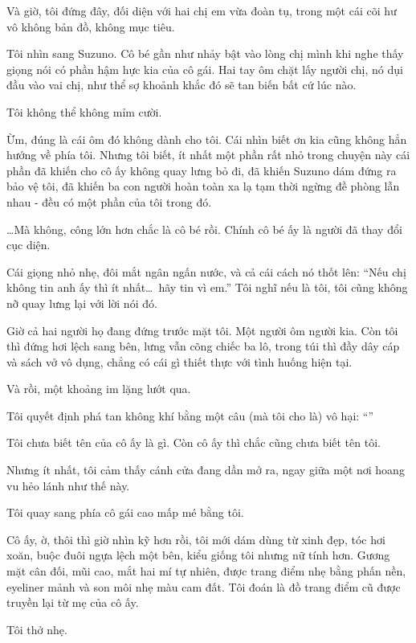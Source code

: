 \documentclass[../main.tex]{subfiles}
\begin{document}
Và giờ, tôi đứng đây, đối diện với hai chị em vừa đoàn tụ, trong một cái cõi hư vô không bản đồ, không mục tiêu.

Tôi nhìn sang Suzuno. Cô bé gần như nhảy bật vào lòng chị mình khi nghe thấy giọng nói có phần hậm hực kia của cô gái. Hai tay ôm chặt lấy người chị, nó dụi đầu vào vai chị, như thể sợ khoảnh khắc đó sẽ tan biến bất cứ lúc nào.

Tôi không thể không mỉm cười.

Ừm, đúng là cái ôm đó không dành cho tôi. Cái nhìn biết ơn kia cũng không hẳn hướng về phía tôi. Nhưng tôi biết, ít nhất một phần rất nhỏ trong chuyện này cái phần đã khiến cho cô ấy không quay lưng bỏ đi, đã khiến Suzuno dám đứng ra bảo vệ tôi, đã khiến ba con người hoàn toàn xa lạ tạm thời ngừng đề phòng lẫn nhau - đều có một phần của tôi trong đó.

\dots Mà không, công lớn hơn chắc là cô bé rồi. Chính cô bé ấy là người đã thay đổi cục diện.

Cái giọng nhỏ nhẹ, đôi mắt ngân ngấn nước, và cả cái cách nó thốt lên: ``Nếu chị không tin anh ấy thì ít nhất\dots\ hãy tin vì em.'' Tôi nghĩ nếu là tôi, tôi cũng không nỡ quay lưng lại với lời nói đó.

Giờ cả hai người họ đang đứng trước mặt tôi. Một người ôm người kia. Còn tôi thì đứng hơi lệch sang bên, lưng vẫn cõng chiếc ba lô, trong túi thì đầy dây cáp và sách vở vô dụng, chẳng có cái gì thiết thực với tình huống hiện tại.

Và rồi, một khoảng im lặng lướt qua.

Tôi quyết định phá tan không khí bằng một câu (mà tôi cho là) vô hại: ``''

Tôi chưa biết tên của cô ấy là gì. Còn cô ấy thì chắc cũng chưa biết tên tôi.

Nhưng ít nhất, tôi cảm thấy cánh cửa đang dần mở ra, ngay giữa một nơi hoang vu hẻo lánh như thế này.

Tôi quay sang phía cô gái cao mấp mé bằng tôi.

Cô ấy, ờ, thôi thì giờ nhìn kỹ hơn rồi, tôi mới dám dùng từ xinh đẹp, tóc hơi xoăn, buộc đuôi ngựa lệch một bên, kiểu giống tôi nhưng nữ tính hơn. Gương mặt cân đối, mũi cao, mắt hai mí tự nhiên, được trang điểm nhẹ bằng phấn nền, eyeliner mảnh và son môi nhẹ màu cam đất. Tôi đoán là đồ trang điểm cũ được truyền lại từ mẹ của cô ấy.

Tôi thở nhẹ.
\end{document}
